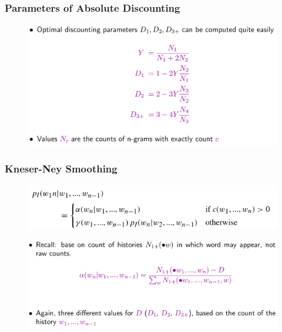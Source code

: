 \documentclass{beamer}
\begin{document}

\begin{frame}\frametitle{Parameters of Absolute Discounting}
\begin{figure}
\includegraphics[width=0.9\linewidth]{figure/absolute_discounting_para.pdf}
\end{figure}
\end{frame}



\begin{frame}\frametitle{Kneser-Ney Smoothing}
\vspace{-3pt}
\begin{figure}
\includegraphics[width=1\linewidth]{figure/modified_kneser_ney.pdf}
\end{figure}
\vspace{-7pt}
\begin{figure}
\includegraphics[width=1\linewidth]{figure/modified_kneser_ney_low_order.pdf}
\end{figure}

\end{frame}
\end{document}

